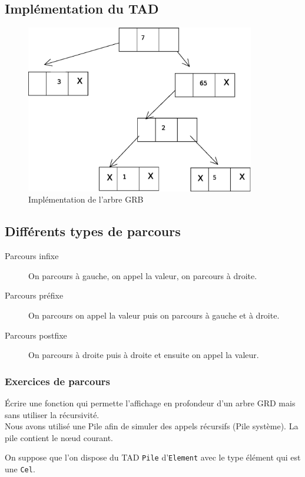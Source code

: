 	\subsection{Implémentation du TAD}
\begin{figure}[H]
\centering
\includegraphics[width=10cm]{content/schemas/arbresGRBImplementation.eps}
\caption{Implémentation de l'arbre GRB}
\end{figure}



\subsection{Différents types de parcours}
\begin{description}
	\item[Parcours infixe] On parcours à gauche, on appel la valeur, on parcours à droite.
	\item[Parcours préfixe] On parcours on appel la valeur puis on parcours à gauche et à droite.
	\item[Parcours postfixe] On parcours à droite puis à droite et ensuite on appel la valeur.
\end{description}
\subsubsection{Exercices de parcours}
Écrire une fonction qui permette l'affichage en profondeur d'un arbre GRD mais sans utiliser la récursivité.\\
Nous avons utilisé une Pile afin de simuler des appels récursifs (Pile système). La pile contient le n\oe{}ud courant.

On suppose que l'on dispose du TAD \texttt{Pile} d'\texttt{Element} avec le type élément qui est une \texttt{Cel}.


